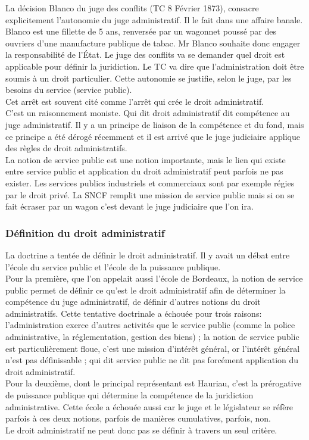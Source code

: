 \documentclass[10pt, a4paper, openany]{book}
\begin{document}
La décision Blanco du juge des conflits (TC 8 Février 1873), consacre explicitement l'autonomie du juge administratif. Il le fait dans une affaire banale. Blanco est une fillette de 5 ans, renversée par un wagonnet poussé par des ouvriers d'une manufacture publique de tabac. Mr Blanco souhaite donc engager la responsabilité de l'État. Le juge des conflits va se demander quel droit est applicable pour définir la juridiction. Le TC va dire que l'administration doit être soumis à un droit particulier. Cette autonomie se justifie, selon le juge, par les besoins du service (service public). \\
Cet arrêt est souvent cité comme l'arrêt qui crée le droit administratif. \\
C'est un raisonnement moniste. Qui dit droit administratif dit compétence au juge administratif. Il y a un principe de liaison de la compétence et du fond, mais ce principe a été dérogé récemment et il est arrivé que le juge judiciaire applique des règles de droit administratifs. \\
La notion de service public est une notion importante, mais le lien qui existe entre service public et application du droit administratif peut parfois ne pas exister. Les services publics industriels et commerciaux sont par exemple régies par le droit privé. La SNCF remplit une mission de service public mais si on se fait écraser par un wagon c'est devant le juge judiciaire que l'on ira.

\subsubsection{Définition du droit administratif}

La doctrine a tentée de définir le droit administratif. Il y avait un débat entre l'école du service public et l'école de la puissance publique. \\
Pour la première, que l'on appelait aussi l'école de Bordeaux, la notion de service public permet de définir ce qu'est le droit administratif afin de déterminer la compétence du juge administratif, de définir d'autres notions du droit administratifs. Cette tentative doctrinale a échouée pour trois raisons: l'administration exerce d'autres activités que le service public (comme la police administrative, la réglementation, gestion des biens) ; la notion de service public est particulièrement floue, c'est une mission d'intérêt général, or l'intérêt général n'est pas définissable ; qui dit service public ne dit pas forcément application du droit administratif. \\
Pour la deuxième, dont le principal représentant est Hauriau, c'est la prérogative de puissance publique qui détermine la compétence de la juridiction administrative. Cette école a échouée aussi car le juge et le législateur se réfère parfois à ces deux notions, parfois de manières cumulatives, parfois, non. \\
Le droit administratif ne peut donc pas se définir à travers un seul critère. 
\end{document}
